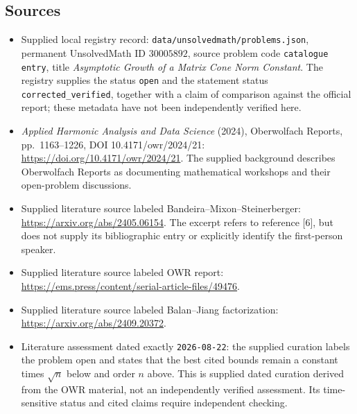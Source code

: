 \documentclass[11pt]{article}
\begin{document}
\subsection{Sources}
\begin{itemize}
\item Supplied local registry record: \texttt{data/unsolvedmath/problems.json}, permanent UnsolvedMath ID \(30005892\), source problem code \texttt{catalogue entry}, title \emph{Asymptotic Growth of a Matrix Cone Norm Constant}. The registry supplies the status \texttt{open} and the statement status \texttt{corrected\_verified}, together with a claim of comparison against the official report; these metadata have not been independently verified here.
\item \emph{Applied Harmonic Analysis and Data Science} (2024), Oberwolfach Reports, pp.~1163--1226, DOI 10.4171/owr/2024/21: \url{https://doi.org/10.4171/owr/2024/21}. The supplied background describes Oberwolfach Reports as documenting mathematical workshops and their open-problem discussions.
\item Supplied literature source labeled Bandeira--Mixon--Steinerberger: \url{https://arxiv.org/abs/2405.06154}. The excerpt refers to reference [6], but does not supply its bibliographic entry or explicitly identify the first-person speaker.
\item Supplied literature source labeled OWR report: \url{https://ems.press/content/serial-article-files/49476}.
\item Supplied literature source labeled Balan--Jiang factorization: \url{https://arxiv.org/abs/2409.20372}.
\item Literature assessment dated exactly \texttt{2026-08-22}: the supplied curation labels the problem open and states that the best cited bounds remain a constant times \(\sqrt n\) below and order \(n\) above. This is supplied dated curation derived from the OWR material, not an independently verified assessment. Its time-sensitive status and cited claims require independent checking.
\end{itemize}
\end{document}
